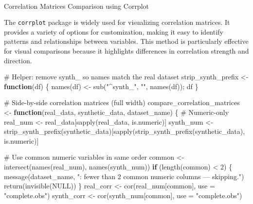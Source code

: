 \documentclass[
  letterpaper,
  DIV=11,
  numbers=noendperiod]{scrartcl}
\makeatletter
\let\oldparagraph\paragraph
\renewcommand{\paragraph}{
    \@ifstar
      \xxxParagraphStar
      \xxxParagraphNoStar
  }
\newcommand{\xxxParagraphStar}[1]{\oldparagraph*{#1}\mbox{}}
\newcommand{\xxxParagraphNoStar}[1]{\oldparagraph{#1}\mbox{}}
\newenvironment{Shaded}{\begin{snugshade}}{\end{snugshade}}
\newcommand{\AttributeTok}[1]{\textcolor[rgb]{0.40,0.45,0.13}{#1}}
\newcommand{\CommentTok}[1]{\textcolor[rgb]{0.37,0.37,0.37}{#1}}
\newcommand{\ConstantTok}[1]{\textcolor[rgb]{0.56,0.35,0.01}{#1}}
\newcommand{\ControlFlowTok}[1]{\textcolor[rgb]{0.00,0.23,0.31}{\textbf{#1}}}
\newcommand{\DecValTok}[1]{\textcolor[rgb]{0.68,0.00,0.00}{#1}}
\newcommand{\FunctionTok}[1]{\textcolor[rgb]{0.28,0.35,0.67}{#1}}
\newcommand{\NormalTok}[1]{\textcolor[rgb]{0.00,0.23,0.31}{#1}}
\newcommand{\OtherTok}[1]{\textcolor[rgb]{0.00,0.23,0.31}{#1}}
\newcommand{\SpecialCharTok}[1]{\textcolor[rgb]{0.37,0.37,0.37}{#1}}
\newcommand{\StringTok}[1]{\textcolor[rgb]{0.13,0.47,0.30}{#1}}
\makeatother
\begin{document}
\paragraph{Correlation Matrices Comparison using
Corrplot}\label{correlation-matrices-comparison-using-corrplot}

The \texttt{corrplot} package is widely used for visualizing correlation
matrices. It provides a variety of options for customization, making it
easy to identify patterns and relationships between variables. This
method is particularly effective for visual comparisons because it
highlights differences in correlation strength and direction.

\begin{Shaded}
\begin{Highlighting}[]
\CommentTok{\# Helper: remove \textquotesingle{}synth\_\textquotesingle{} so names match the real dataset}
\NormalTok{strip\_synth\_prefix }\OtherTok{\textless{}{-}} \ControlFlowTok{function}\NormalTok{(df) \{ }\FunctionTok{names}\NormalTok{(df) }\OtherTok{\textless{}{-}} \FunctionTok{sub}\NormalTok{(}\StringTok{"\^{}synth\_"}\NormalTok{, }\StringTok{""}\NormalTok{, }\FunctionTok{names}\NormalTok{(df)); df \}}

\CommentTok{\# Side{-}by{-}side correlation matrices (full width)}
\NormalTok{compare\_correlation\_matrices }\OtherTok{\textless{}{-}} \ControlFlowTok{function}\NormalTok{(real\_data, synthetic\_data, dataset\_name) \{}
  \CommentTok{\# Numeric{-}only}
\NormalTok{  real\_num  }\OtherTok{\textless{}{-}}\NormalTok{ real\_data[}\FunctionTok{sapply}\NormalTok{(real\_data, is.numeric)]}
\NormalTok{  synth\_num }\OtherTok{\textless{}{-}} \FunctionTok{strip\_synth\_prefix}\NormalTok{(synthetic\_data)[}\FunctionTok{sapply}\NormalTok{(}\FunctionTok{strip\_synth\_prefix}\NormalTok{(synthetic\_data), is.numeric)]}

  \CommentTok{\# Use common numeric variables in same order}
\NormalTok{  common }\OtherTok{\textless{}{-}} \FunctionTok{intersect}\NormalTok{(}\FunctionTok{names}\NormalTok{(real\_num), }\FunctionTok{names}\NormalTok{(synth\_num))}
  \ControlFlowTok{if}\NormalTok{ (}\FunctionTok{length}\NormalTok{(common) }\SpecialCharTok{\textless{}} \DecValTok{2}\NormalTok{) \{}
    \FunctionTok{message}\NormalTok{(dataset\_name, }\StringTok{": fewer than 2 common numeric columns — skipping."}\NormalTok{)}
    \FunctionTok{return}\NormalTok{(}\FunctionTok{invisible}\NormalTok{(}\ConstantTok{NULL}\NormalTok{))}
\NormalTok{  \}}
\NormalTok{  real\_corr  }\OtherTok{\textless{}{-}} \FunctionTok{cor}\NormalTok{(real\_num[common],  }\AttributeTok{use =} \StringTok{"complete.obs"}\NormalTok{)}
\NormalTok{  synth\_corr }\OtherTok{\textless{}{-}} \FunctionTok{cor}\NormalTok{(synth\_num[common], }\AttributeTok{use =} \StringTok{"complete.obs"}\NormalTok{)}


\end{Highlighting}
\end{Shaded}
\end{document}
